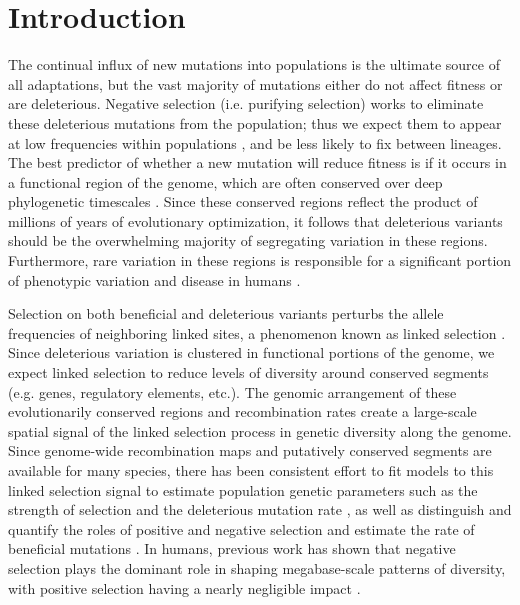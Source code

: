 \documentclass[11pt]{article}
\begin{document}
\section*{Introduction}

The continual influx of new mutations into populations is the ultimate source
of all adaptations, but the vast majority of mutations either do not affect
fitness or are deleterious. Negative selection (i.e. purifying selection) works
to eliminate these deleterious mutations from the population; thus we expect
them to appear at low frequencies within populations
\parencite{Haldane1927-ga}, and be less likely to fix between lineages. The
best predictor of whether a new mutation will reduce fitness is if it occurs in
a functional region of the genome, which are often conserved over deep
phylogenetic timescales \parencite{Siepel2005-wh,Margulies2003-sn}. Since these
conserved regions reflect the product of millions of years of evolutionary
optimization, it follows that deleterious variants should be the overwhelming
majority of segregating variation in these regions. Furthermore, rare variation
in these regions is responsible for a significant portion of phenotypic
variation and disease in humans
\parencite{Zeng2018-ci,Lek2016-cb,Karczewski2020-ky,Tennessen2012-ge}.

Selection on both beneficial and deleterious variants perturbs the allele
frequencies of neighboring linked sites, a phenomenon known as linked selection
\parencite{Nordborg1996-nq,Maynard_Smith1974-zr,Barton1998-aj,Charlesworth1993-gb}.
Since deleterious variation is clustered in functional portions of the genome,
we expect linked selection to reduce levels of diversity around conserved
segments (e.g. genes, regulatory elements, etc.). The genomic arrangement of
these evolutionarily conserved regions and recombination rates create a
large-scale spatial signal of the linked selection process in genetic diversity
along the genome. Since genome-wide recombination maps and putatively conserved
segments are available for many species, there has been consistent effort to
fit models to this linked selection signal to estimate population genetic
parameters such as the strength of selection and the deleterious mutation rate
\parencite{Hudson1995-pt,McVicker2009-ax}, as well as distinguish and quantify
the roles of positive and negative selection and estimate the rate of
beneficial mutations \parencite{Elyashiv2016-vt,Murphy2022-sj}. In humans,
previous work has shown that negative selection plays the dominant role in
shaping megabase-scale patterns of diversity, with positive selection having a
nearly negligible impact \parencite{Murphy2022-sj}.
\end{document}
